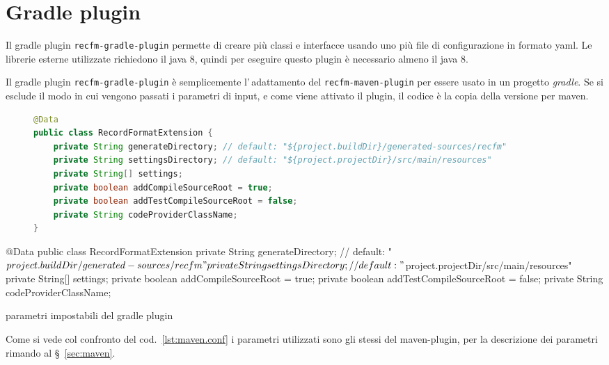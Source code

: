 \chapter{Gradle plugin}\label{sec:gradle}
Il gradle plugin \verb!recfm-gradle-plugin! permette di creare più classi e 
interfacce usando uno più file di configurazione in formato yaml.
Le librerie esterne utilizzate richiedono il java 8, quindi per eseguire questo 
plugin è necessario almeno il java 8.

Il gradle plugin \verb!recfm-gradle-plugin! è semplicemente l'\,adattamento del 
\verb!recfm-maven-plugin! per essere usato in un progetto \textsl{gradle}.
Se si esclude il modo in cui vengono passati i parametri di input, e come viene
attivato il plugin, il codice è la copia della versione per maven.

\ifesource
\begin{figure*}[!htb]
\begin{lstlisting}[language=java, caption=parametri impostabili del gradle plugin, 
label=lst:gradle.conf]
@Data
public class RecordFormatExtension {
    private String generateDirectory; // default: "${project.buildDir}/generated-sources/recfm"
    private String settingsDirectory; // default: "${project.projectDir}/src/main/resources"
    private String[] settings;
    private boolean addCompileSourceRoot = true;
    private boolean addTestCompileSourceRoot = false;
    private String codeProviderClassName;
}
\end{lstlisting}
\end{figure*}
\else
\begin{elisting}[!htb]
\begin{javacode}
@Data
public class RecordFormatExtension {
    private String generateDirectory; // default: "${project.buildDir}/generated-sources/recfm"
    private String settingsDirectory; // default: "${project.projectDir}/src/main/resources"
    private String[] settings;
    private boolean addCompileSourceRoot = true;
    private boolean addTestCompileSourceRoot = false;
    private String codeProviderClassName;
}
\end{javacode}
\caption{parametri impostabili del gradle plugin}
\label{lst:gradle.conf}
\end{elisting}
\fi
Come si vede col confronto del cod.~\ref{lst:maven.conf} i parametri utilizzati
sono gli stessi del maven-plugin, per la descrizione dei parametri rimando
al \S~\ref{sec:maven}.

